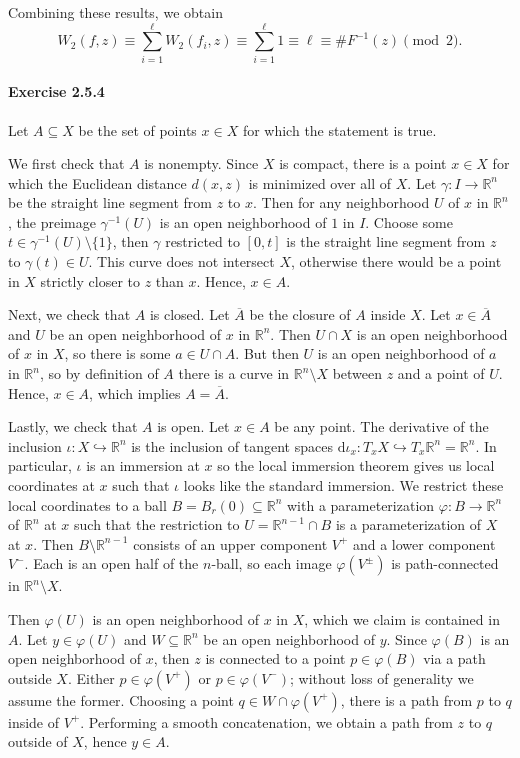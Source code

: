 \documentclass[12pt]{article}
\newcommand{\pnum}[1]{\paragraph{#1}}
\theoremstyle{definition}
\newcommand{\R}{\mathbb{R}}
\renewcommand{\phi}{\varphi}
\newcommand{\<}{\langle}
\renewcommand{\>}{\rangle}
\newcommand{\clo}{\overline}
\newcommand{\seq}{\subseteq}
\newcommand{\inc}{\hookrightarrow}
\newcommand{\dd}{\mathrm{d}}
\begin{document}
Combining these results, we obtain
\[
    W_2(f, z)
        \equiv \sum_{i=1}^{\ell} W_2(f_i, z)
        \equiv \sum_{i=1}^{\ell} 1
        \equiv \ell
        \equiv \#F^{-1}(z) \pmod{2}.
\]

\pnum{Exercise 2.5.4}

Let $A \seq X$ be the set of points $x \in X$ for which the statement is true.

We first check that $A$ is nonempty.
Since $X$ is compact, there is a point $x \in X$ for which the Euclidean distance $d(x, z)$ is minimized over all of $X$.
Let $\gamma : I \to \R^n$ be the straight line segment from $z$ to $x$.
Then for any neighborhood $U$ of $x$ in $\R^n$, the preimage $\gamma^{-1}(U)$ is an open neighborhood of $1$ in $I$.
Choose some $t \in \gamma^{-1}(U) \setminus \{1\}$, then $\gamma$ restricted to $[0, t]$ is the straight line segment from $z$ to $\gamma(t) \in U$.
This curve does not intersect $X$, otherwise there would be a point in $X$ strictly closer to $z$ than $x$.
Hence, $x \in A$.

Next, we check that $A$ is closed.
Let $\clo{A}$ be the closure of $A$ inside $X$.
Let $x \in \clo{A}$ and $U$ be an open neighborhood of $x$ in $\R^n$.
Then $U \cap X$ is an open neighborhood of $x$ in $X$, so there is some $a \in U \cap A$.
But then $U$ is an open neighborhood of $a$ in $\R^n$, so by definition of $A$ there is a curve in $\R^n \setminus X$ between $z$ and a point of $U$.
Hence, $x \in A$, which implies $A = \clo{A}$.

Lastly, we check that $A$ is open.
Let $x \in A$ be any point.
The derivative of the inclusion $\iota : X \inc \R^n$ is the inclusion of tangent spaces $\dd{\iota}_x : T_xX \inc T_x\R^n = \R^n$.
In particular, $\iota$ is an immersion at $x$ so the local immersion theorem gives us local coordinates at $x$ such that $\iota$ looks like the standard immersion.
We restrict these local coordinates to a ball $B = B_r(0) \seq \R^n$ with a parameterization $\phi : B \to \R^n$ of $\R^n$ at $x$ such that the restriction to $U = \R^{n-1} \cap B$ is a parameterization of $X$ at $x$.
Then $B \setminus \R^{n-1}$ consists of an upper component $V^+$ and a lower component $V^-$.
Each is an open half of the $n$-ball, so each image $\phi(V^\pm)$ is path-connected in $\R^n \setminus X$.

Then $\phi(U)$ is an open neighborhood of $x$ in $X$, which we claim is contained in $A$.
Let $y \in \phi(U)$ and $W \seq \R^n$ be an open neighborhood of $y$.
Since $\phi(B)$ is an open neighborhood of $x$, then $z$ is connected to a point $p \in \phi(B)$ via a path outside $X$.
Either $p \in \phi(V^+)$ or $p \in \phi(V^-)$; without loss of generality we assume the former.
Choosing a point $q \in W \cap \phi(V^+)$, there is a path from $p$ to $q$ inside of $V^+$.
Performing a smooth concatenation, we obtain a path from $z$ to $q$ outside of $X$, hence $y \in A$.
\end{document}
